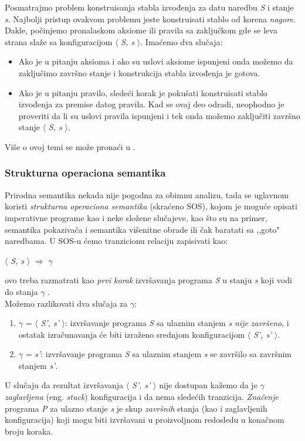 \documentclass[a4paper]{article}
\begin{document}
{Posmatrajmo problem konstruisanja stabla izvođenja za datu naredbu \textit{S} i stanje \textit{s}. Najbolji pristup ovakvom problemu jeste konstruisati stablo od korena \textit{nagore}. Dakle, počinjemo pronalaskom aksiome ili pravila sa zaključkom gde se leva strana slaže sa konfiguracijom $\langle$ \textit{S, s} $\rangle$. Imaćemo dva slučaja:
\begin{itemize}
	\item Ako je u pitanju aksioma i ako su uslovi aksiome ispunjeni onda možemo da zaključimo završno stanje i konstrukcija stabla izvođenja je gotova.
	\item Ako je u pitanju pravilo, sledeći korak je pokušati konstruisati stablo izvođenja za premise datog pravila. Kad se ovaj deo odradi, neophodno je proveriti da li su uslovi pravila ispunjeni i tek onda možemo zaključiti završno stanje  $\langle$ \textit{S, s} $\rangle$.
\end{itemize}
Više o ovoj temi se može pronaći u \cite{wiley}.

\subsubsection{Strukturna operaciona semantika}
Prirodna semantika nekada nije pogodna za obimnu analizu, tada se uglavnom koristi \textit{strukturna operaciona semantika} (skraćeno SOS), kojom je moguće opisati imperativne programe kao i neke složene slučajeve, kao što su na primer, semantika pokazivača i semantika višenitne obrade ili čak baratati sa ,,goto" naredbama. U SOS-u ćemo tranzicionu relaciju zapisivati kao:
\begin{center} $\langle$ \textit{S, s} $\rangle$ $\Longrightarrow$ \textit{$\gamma$} \end{center}
ovo treba razmatrati kao {\em prvi korak} izvršavanja programa \textit{S} u stanju \textit{s} koji vodi do stanja \textit{$\gamma$} \cite{wiley}.\\
Možemo razlikovati dva slučaja za $\gamma$:
\begin{enumerate}
	\item $\gamma$ = $\langle$ \textit{S', s'} $\rangle$: izvršavanje programa \textit{S} sa ulaznim stanjem \textit{s} {\em nije završeno}, i ostatak izračunavanja će biti izraženo srednjom konfiguracijom $\langle$ \textit{S', s'} $\rangle$.
	\item $\gamma$ = \textit{s'}: izvršavanje programa \textit{S} sa ulaznim stanjem \textit{s} se završilo sa završnim stanjem \textit{s'}.
\end{enumerate}
U slučaju da rezultat izvršavanja $\langle$ \textit{S', s'} $\rangle$ nije dostupan kažemo da je $\gamma$ \textit{zaglavljena} (eng. {\em stuck}) konfiguracija i da nema sledećih tranzicija. \textit{Značenje} programa \textit{P} za ulazno stanje \textit{s} je skup \textit{završnih} stanja (kao i zaglavljenih konfiguracija) koji mogu biti izvršavani u proizvoljnom redosledu u konačnom broju koraka.

}
\end{document}
